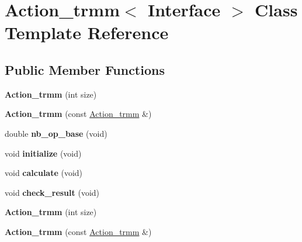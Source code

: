 \hypertarget{class_action__trmm}{}\section{Action\+\_\+trmm$<$ Interface $>$ Class Template Reference}
\label{class_action__trmm}
\subsection*{Public Member Functions}
\begin{DoxyCompactItemize}
\item 
\mbox{\label{class_action__trmm_aa69a7a4e3977de0e01cb64176f032f76}} 
{\bfseries Action\+\_\+trmm} (int size)
\item 
\mbox{\label{class_action__trmm_ab275933cc7053acf70d51ceeed77f937}} 
{\bfseries Action\+\_\+trmm} (const \hyperlink{class_action__trmm}{Action\+\_\+trmm} \&)
\item 
\mbox{\label{class_action__trmm_a3e53b63442baed9bc823b8984072226e}} 
double {\bfseries nb\+\_\+op\+\_\+base} (void)
\item 
\mbox{\label{class_action__trmm_ac383abfa1691eb1f99ea3ff8dac0240d}} 
void {\bfseries initialize} (void)
\item 
\mbox{\label{class_action__trmm_aef88530851774b4d1d667e1e14d5fa99}} 
void {\bfseries calculate} (void)
\item 
\mbox{\label{class_action__trmm_afed33724e086f636156f133354b2f94a}} 
void {\bfseries check\+\_\+result} (void)
\item 
\mbox{\label{class_action__trmm_aa69a7a4e3977de0e01cb64176f032f76}} 
{\bfseries Action\+\_\+trmm} (int size)
\item 
\mbox{\label{class_action__trmm_ab275933cc7053acf70d51ceeed77f937}} 
{\bfseries Action\+\_\+trmm} (const \hyperlink{class_action__trmm}{Action\+\_\+trmm} \&)
\item 
\mbox{\label{class_action__trmm_a3e53b63442baed9bc823b8984072226e}} 

\end{DoxyCompactItemize}
